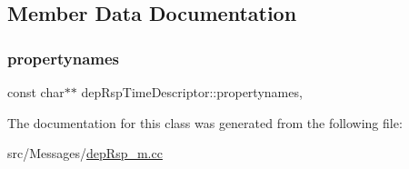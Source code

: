 \subsection{Member Data Documentation}
\mbox{\label{classdepRspTimeDescriptor_aa00fe09f472957d38fb825d538d5c090}} 
\subsubsection{\texorpdfstring{propertynames}{propertynames}}
{\footnotesize\ttfamily const char$\ast$$\ast$ dep\+Rsp\+Time\+Descriptor\+::propertynames\hspace{0.3cm}{\ttfamily [mutable]}, {\ttfamily [private]}}



The documentation for this class was generated from the following file\+:\begin{DoxyCompactItemize}
\item 
src/\+Messages/\hyperlink{depRsp__m_8cc}{dep\+Rsp\+\_\+m.\+cc}\end{DoxyCompactItemize}
